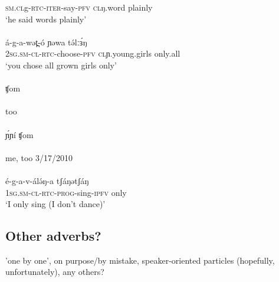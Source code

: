 \textsc{sm.cl}g-\textsc{rtc-iter}-say-\textsc{pfv}  	\textsc{cl}ŋ.word   plainly\\
\trans ‘he said words plainly’\\
\\
\gll á-g-a-wət̪-ó 	ɲəwa 	tə́lːɜ́ŋ\\
2\textsc{sg.sm-cl-rtc}-choose-\textsc{pfv}  	\textsc{cl}ɲ.young.girls  only.all\\
\trans ‘you chose all grown girls only’\\
\\
\gll ʧom\\
\\
\trans too\\
\\
\gll ɲ́ɲí ʧom\\
\\
\trans me, too		\hfill	3/17/2010\\
\\
\gll é-g-a-v-álə́ŋ-a 	tʃáŋətʃáŋ	\\
1\textsc{sg.sm-cl-rtc-prog}-sing-\textsc{ipfv}	only	\\
\trans ‘I only sing (I don’t dance)’\\

\subsection{Other adverbs?}

'one by one', on purpose/by mistake, speaker-oriented particles (hopefully, unfortunately), any others?


